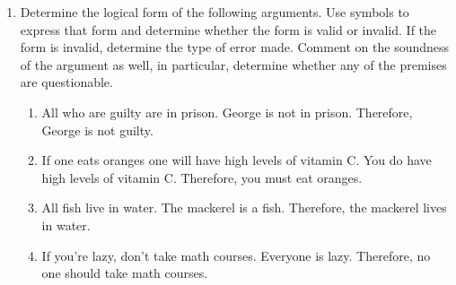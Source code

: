 \begin{enumerate}
\item Determine the logical form of the following arguments.  Use symbols
to express that form and determine whether the form is valid or invalid.
If the form is invalid, determine the type of error made.  Comment on the 
soundness of the argument as well, in particular, determine whether any of
the premises are questionable.
\begin{enumerate}
\item All who are guilty are in prison. \newline
  George is not in prison.  \newline
  Therefore, George is not guilty.
 
 \wbvfill
 

\item If one eats oranges one will have high levels of vitamin C. \newline
  You do have high levels of vitamin C. \newline
  Therefore, you must eat oranges.
  
  \wbvfill

\workbookpagebreak

\item All fish live in water. \newline
  The mackerel is a fish. \newline
  Therefore, the mackerel lives in water. 
  
  \wbvfill

\item If you're lazy, don't take math courses.\newline
  Everyone is lazy. \newline
  Therefore, no one should take math courses.
  

\end{enumerate}
\end{enumerate}
